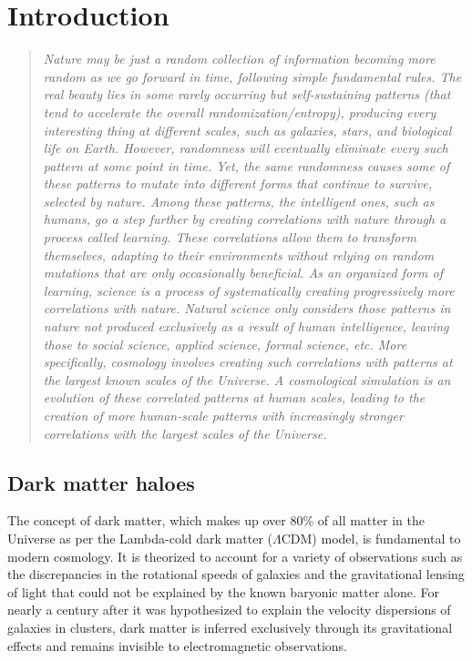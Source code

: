 \chapter{Introduction}
\label{chap:intro}

\begin{quote}
\textit{Nature may be just a random collection of information becoming more random as we go forward in time, following simple fundamental rules. The real beauty lies in some rarely occurring but self-sustaining patterns (that tend to accelerate the overall randomization/entropy), producing every interesting thing at different scales, such as galaxies, stars, and biological life on Earth. However, randomness will eventually eliminate every such pattern at some point in time. Yet, the same randomness causes some of these patterns to mutate into different forms that continue to survive, selected by nature. Among these patterns, the intelligent ones, such as humans, go a step further by creating correlations with nature through a process called learning. These correlations allow them to transform themselves, adapting to their environments without relying on random mutations that are only occasionally beneficial. As an organized form of learning, science is a process of systematically creating progressively more correlations with nature. Natural science only considers those patterns in nature not produced exclusively as a result of human intelligence, leaving those to social science, applied science, formal science, etc. More specifically, cosmology involves creating such correlations with patterns at the largest known scales of the Universe. A cosmological simulation is an evolution of these correlated patterns at human scales, leading to the creation of more human-scale patterns with increasingly stronger correlations with the largest scales of the Universe.}

    
    
\end{quote}
    


\section{Dark matter haloes}

The concept of dark matter, which makes up over 80\% of all matter in the Universe as per the Lambda-cold dark matter ($\Lambda$CDM) model, is fundamental to modern cosmology. It is theorized to account for a variety of observations such as the discrepancies in the rotational speeds of galaxies and the gravitational lensing of light that could not be explained by the known baryonic matter alone. For nearly a century after it was hypothesized to explain the velocity dispersions of galaxies in clusters, dark matter is inferred exclusively through its gravitational effects and remains invisible to electromagnetic observations. %

